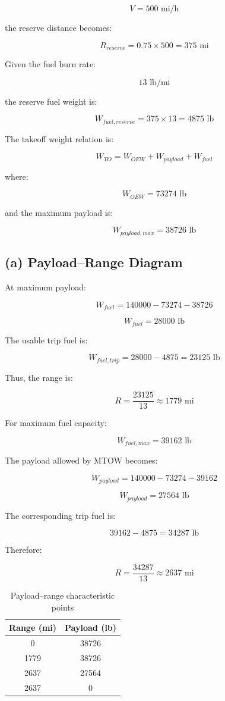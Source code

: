 \documentclass{KPS_assignment}
\begin{document}
\[
V = 500 \text{ mi/h}
\]

the reserve distance becomes:

\[
R_{reserve} = 0.75 \times 500 = 375 \text{ mi}
\]

Given the fuel burn rate:

\[
13 \text{ lb/mi}
\]

the reserve fuel weight is:

\[
W_{fuel,reserve} = 375 \times 13 = 4875 \text{ lb}
\]

The takeoff weight relation is:

\[
W_{TO} = W_{OEW} + W_{payload} + W_{fuel}
\]

where:

\[
W_{OEW} = 73274 \text{ lb}
\]

and the maximum payload is:

\[
W_{payload,max} = 38726 \text{ lb}
\]

\subsection*{(a) Payload--Range Diagram}

At maximum payload:

\[
W_{fuel} = 140000 - 73274 - 38726
\]

\[
W_{fuel} = 28000 \text{ lb}
\]

The usable trip fuel is:

\[
W_{fuel,trip} = 28000 - 4875 = 23125 \text{ lb}
\]

Thus, the range is:

\[
R = \frac{23125}{13} \approx 1779 \text{ mi}
\]

For maximum fuel capacity:

\[
W_{fuel,max} = 39162 \text{ lb}
\]

The payload allowed by MTOW becomes:

\[
W_{payload} = 140000 - 73274 - 39162
\]

\[
W_{payload} = 27564 \text{ lb}
\]

The corresponding trip fuel is:

\[
39162 - 4875 = 34287 \text{ lb}
\]

Therefore:

\[
R = \frac{34287}{13} \approx 2637 \text{ mi}
\]

\begin{table}[h]
\centering
\begin{tabular}{cc}
\hline
\textbf{Range (mi)} & \textbf{Payload (lb)} \\
\hline
0 & 38726 \\
1779 & 38726 \\
2637 & 27564 \\
2637 & 0 \\
\hline
\end{tabular}
\caption{Payload--range characteristic points}
\end{table}
\end{document}
